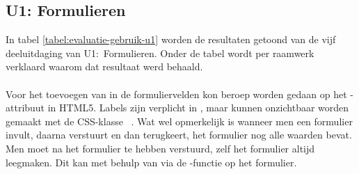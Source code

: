
\subsection{U1: Formulieren}
In tabel \ref{tabel:evaluatie-gebruik-u1} worden de resultaten getoond van de vijf deeluitdaging van U1:~Formulieren.
Onder de tabel wordt per raamwerk verklaard waarom dat resultaat werd behaald.

\begin{table}[H]
\centering
{}
\caption{Gebruik voor U1: Formulieren}
\label{tabel:evaluatie-gebruik-u1}
\end{table}


\paragraph{\jqm} 
Voor het toevoegen van  in de formuliervelden kon beroep worden gedaan op het -attribuut in HTML5. 
Labels zijn verplicht in \jqm{}, maar kunnen onzichtbaar worden gemaakt met de CSS-klasse ~\cite{JQuery2013}. 
Wat wel opmerkelijk is wanneer men een formulier invult, daarna verstuurt en dan terugkeert, het formulier nog alle waarden bevat. 
Men moet na het formulier te hebben verstuurd, zelf het formulier altijd leegmaken. 
Dit kan met behulp van \js{} via de -functie op het formulier.
 
